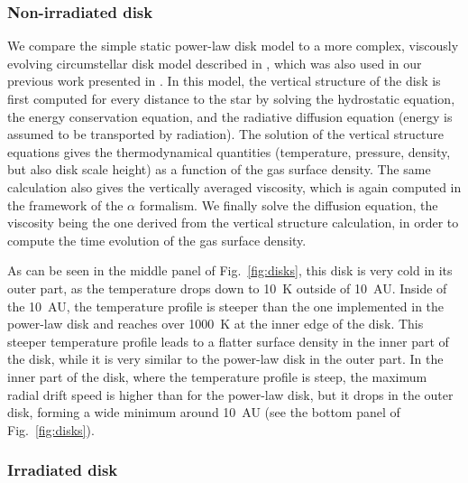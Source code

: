 \documentclass{aa}
\begin{document}
\subsubsection{Non-irradiated disk}

We compare the simple static power-law disk model to a more complex, viscously evolving circumstellar disk model described in \citet{2005A&A...434..343A, 2013A&A...558A.109A}, which was also used in our previous work presented in \citet{2016A&A...594A.105D}. In this model, the vertical structure of the disk is first computed for every distance to the star by solving the hydrostatic equation, the energy conservation equation, and the radiative diffusion equation (energy is assumed to be transported by radiation). The solution of the vertical structure equations gives the thermodynamical quantities (temperature, pressure, density, but also disk scale height) as a function of the gas surface density. The same calculation also gives the vertically averaged viscosity, which is again computed in the framework of the $\alpha$ formalism. We finally solve the diffusion equation, the viscosity being the one derived from the vertical structure calculation, in order to compute the time evolution of the gas surface density. 

As can be seen in the middle panel of Fig.~\ref{fig:disks}, this disk is very cold in its outer part, as the temperature drops down to 10~K outside of 10~AU. Inside of the 10~AU, the temperature profile is steeper than the one implemented in the power-law disk and reaches over 1000~K at the inner edge of the disk. This steeper temperature profile leads to a flatter surface density in the inner part of the disk, while it is very similar to the power-law disk in the outer part. In the inner part of the disk, where the temperature profile is steep, the maximum radial drift speed is higher than for the power-law disk, but it drops in the outer disk, forming a wide minimum around 10~AU (see the bottom panel of Fig.~\ref{fig:disks}).  

\subsubsection{Irradiated disk}
\end{document}
